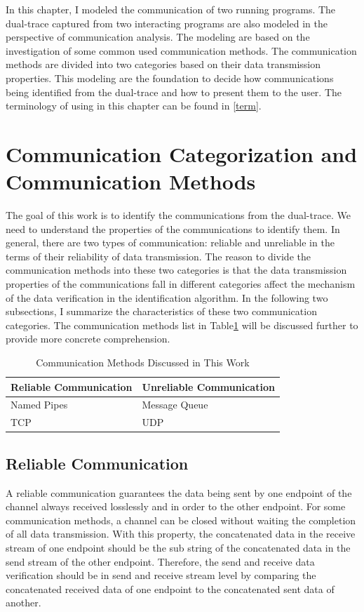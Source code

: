 
\label{chapter:Mod}
In this chapter, I modeled the communication of two running programs. The dual-trace captured from two interacting programs are also modeled in the perspective of communication analysis. The modeling are based on the investigation of some common used communication methods. The communication methods are divided into two categories based on their data transmission properties. This modeling are the foundation to decide how communications being identified from the dual-trace and how to present them to the user. The terminology of using in this chapter can be found in \ref{term}.

\section{Communication Categorization and Communication Methods}
The goal of this work is to identify the communications from the dual-trace. We need to understand the properties of the communications to identify them. In general, there are two types of communication: reliable and unreliable in the terms of their reliability of data transmission. The reason to divide the communication methods into these two categories is that the data transmission properties of the communications fall in different categories affect the mechanism of the data verification in the identification algorithm. In the following two subsections, I summarize the characteristics of these two communication categories. The communication methods list in Table\ref{methodsInCategories} will be discussed further to provide more concrete comprehension. 
\begin{table}[H]
\centering
\caption{Communication Methods Discussed in This Work}
\label{methodsInCategories}
\begin{tabular}{|l|l|}
 \hline
\textbf{Reliable Communication}& \textbf{Unreliable Communication}\\
 \hline
Named Pipes & Message Queue   \\
TCP &  UDP \\
 \hline
\end{tabular}
\end{table}


\subsection{Reliable Communication}\label{reliable}
A reliable communication guarantees the data being sent by one endpoint of the channel always received losslessly and in order to the other endpoint. For some communication methods, a channel can be closed without waiting the completion of all data transmission. With this property, the concatenated data in the receive stream of one endpoint should be the sub string of the concatenated data in the send stream of the other endpoint. Therefore, the send and receive data verification should be in send and receive stream level by comparing the concatenated received data of one endpoint to the concatenated sent data of another. 

